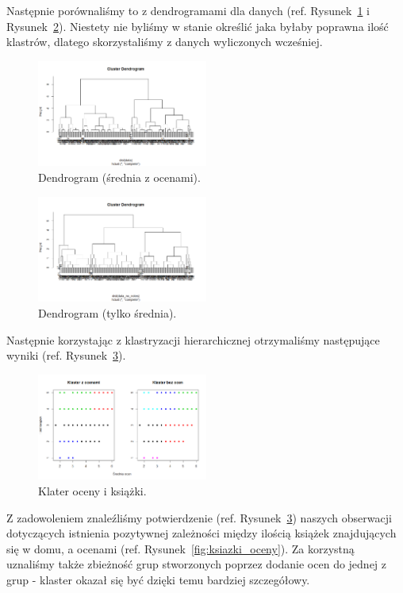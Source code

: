 \documentclass[conference]{IEEEtran}
\begin{document}
Następnie porównaliśmy to z dendrogramami dla danych (ref. Rysunek~\ref{fig:dendrogramam_jeden} i Rysunek~\ref{fig:dendrogramam_dwa}). Niestety nie byliśmy w stanie określić jaka byłaby poprawna ilość klastrów, dlatego skorzystaliśmy z danych wyliczonych wcześniej.

\begin{figure}
	\centering
	\includegraphics[width=0.5\textwidth]{13.png}
	\caption{Dendrogram (średnia z ocenami).}
	\label{fig:dendrogramam_jeden}
\end{figure}
\begin{figure}
	\centering
	\includegraphics[width=0.5\textwidth]{14.png}
	\caption{Dendrogram (tylko średnia).}
	\label{fig:dendrogramam_dwa}
\end{figure}

Następnie korzystając z klastryzacji hierarchicznej otrzymaliśmy następujące wyniki (ref. Rysunek~\ref{fig:klaster}).

\begin{figure}
	\centering
	\includegraphics[width=0.5\textwidth]{15.png}
	\caption{Klater oceny i książki.}
	\label{fig:klaster}
\end{figure}

Z zadowoleniem znaleźliśmy potwierdzenie (ref. Rysunek~\ref{fig:klaster}) naszych obserwacji dotyczących istnienia pozytywnej zależności między ilością książek znajdujących się w domu, a ocenami (ref. Rysunek~\ref{fig:ksiazki_oceny}). Za korzystną uznaliśmy także zbieżność grup stworzonych poprzez dodanie ocen do jednej z grup - klaster okazał się być dzięki temu bardziej szczegółowy.
\end{document}
